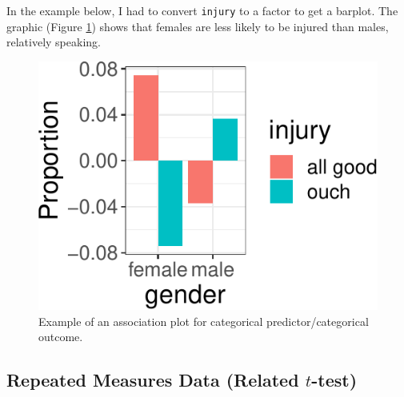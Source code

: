 \documentclass[
  man]{apa6}
\newenvironment{Shaded}{\begin{snugshade}}{\end{snugshade}}
\newcommand{\DataTypeTok}[1]{\textcolor[rgb]{0.13,0.29,0.53}{#1}}
\newcommand{\DecValTok}[1]{\textcolor[rgb]{0.00,0.00,0.81}{#1}}
\newcommand{\KeywordTok}[1]{\textcolor[rgb]{0.13,0.29,0.53}{\textbf{#1}}}
\newcommand{\NormalTok}[1]{#1}
\newcommand{\OperatorTok}[1]{\textcolor[rgb]{0.81,0.36,0.00}{\textbf{#1}}}
\newcommand{\StringTok}[1]{\textcolor[rgb]{0.31,0.60,0.02}{#1}}
\begin{document}
In the example below, I had to convert \texttt{injury} to a factor to get a barplot. The graphic (Figure \ref{fig:association}) shows that females are less likely to be injured than males, relatively speaking.

\small

\begin{Shaded}
\end{Shaded}

\begin{figure}
\centering
\includegraphics{flexplot_psychmeth_files/figure-latex/association-1.pdf}
\caption{\label{fig:association}Example of an association plot for categorical predictor/categorical outcome.\label{fig:association}}
\end{figure}

\normalsize

\hypertarget{repeated-measures-data-related-t-test}{%
\subsection{\texorpdfstring{Repeated Measures Data (Related \(t\)-test)}{Repeated Measures Data (Related t-test)}}\label{repeated-measures-data-related-t-test}}
\end{document}
